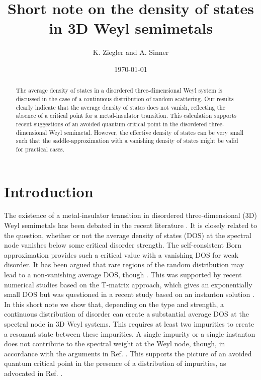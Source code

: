 \documentclass[aps]{revtex4}
\begin{document}
\title{Short note on the density of states in 3D Weyl semimetals
}

\author{K. Ziegler and A. Sinner}
\date{\today}

\begin{abstract}
The average density of states in a disordered three-dimensional Weyl system is discussed in the
case of a continuous distribution of random scattering. Our results clearly indicate that
the average density of states does not vanish, reflecting the absence of a critical point
for a metal-insulator transition. This calculation supports recent suggestions of an avoided
quantum critical point in the disordered three-dimensional Weyl semimetal. However, the
effective density of states can be very small such that the saddle-approximation with
a vanishing density of states might be valid for practical cases.
\end{abstract}

\maketitle


\section{Introduction}

The existence of a metal-insulator transition in disordered three-dimensional (3D) Weyl semimetals 
has been debated in the recent literature 
\cite{huse13,brouwer14,gurarie14,pixley16,pixley16a,pixley16b,ziegler16,pixley17,sbierski17,sinner17,1805}. 
It is closely
related to the question, whether or not the average density of states (DOS) at the spectral 
node vanishes below some critical disorder strength. The self-consistent Born approximation 
provides such a critical value with a vanishing DOS for weak disorder. It has been argued 
that rare regions of the random distribution may lead to a non-vanishing average DOS, though \cite{huse13}. 
This was supported by recent
numerical studies based on the T-matrix approach, which gives an exponentially small
DOS \cite{pixley17} but was questioned in a recent study based on an instanton solution \cite{1805}.
In this short note we show that, depending on the type and strength,
a continuous distribution of disorder can create a substantial average DOS at the 
spectral node in 3D Weyl systems. This requires at least two impurities to create a resonant
state between these impurities. A single impurity or a single instanton does not
contribute to the spectral weight at the Weyl node, though, in accordance with the arguments in 
Ref. \cite{1805}. 
This supports the picture of an avoided quantum critical point in the presence of a 
distribution of impurities, as advocated in Ref. \cite{pixley17}.
\end{document}
